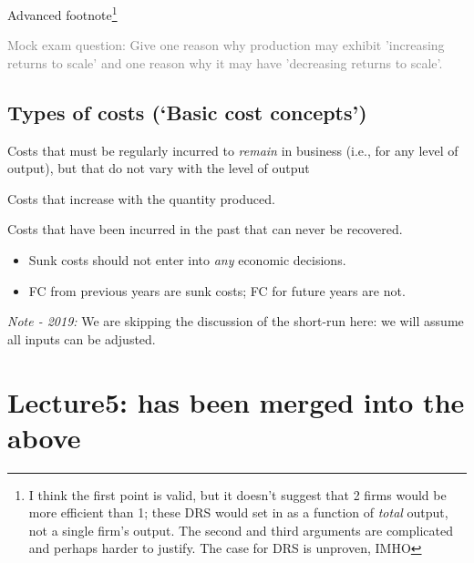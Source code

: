 \documentclass[]{article}
\providecommand{\tightlist}{%
  \setlength{\itemsep}{0pt}\setlength{\parskip}{0pt}}
\begin{document}
\textcolor{RawSienna}{Advanced footnote}\footnote{I think the first
  point is valid, but it doesn't suggest that 2 firms would be more
  efficient than 1; these DRS would set in as a function of \emph{total}
  output, not a single firm's output. The second and third arguments are
  complicated and perhaps harder to justify. The case for DRS is
  unproven, IMHO}

\textcolor{gray}{Mock exam question:
Give one reason why production may exhibit 'increasing returns to scale' and one reason why it may have 'decreasing returns to scale'.}

\hypertarget{types-of-costs-basic-cost-concepts}{%
\subsection{Types of costs (`Basic cost
concepts')}\label{types-of-costs-basic-cost-concepts}}

\begin{description}
\tightlist
\item[Fixed costs (FC)]
Costs that must be regularly incurred to \emph{remain} in business
(i.e., for any level of output), but that do not vary with the level of
output
\end{description}

\begin{description}
\tightlist
\item[Variable costs (VC)]
Costs that increase with the quantity produced.
\end{description}

\begin{description}
\tightlist
\item[Sunk costs]
Costs that have been incurred in the past that can never be recovered.
\end{description}

\begin{itemize}
\tightlist
\item
  Sunk costs should not enter into \emph{any} economic decisions.
\item
  FC from previous years are sunk costs; FC for future years are not.
\end{itemize}

\emph{Note - 2019:} We are skipping the discussion of the short-run
here: we will assume all inputs can be adjusted.

\hypertarget{lecture5-has-been-merged-into-the-above}{%
\section{Lecture5: has been merged into the
above}\label{lecture5-has-been-merged-into-the-above}}
\end{document}
